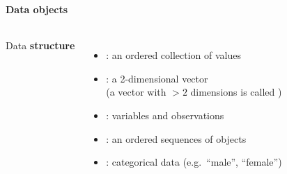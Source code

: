 \documentclass[8pt]{beamer}
\begin{document}
\begin{frame}
\frametitle{\insertsection}
\framesubtitle{Data objects}

\begin{columns}[c]
\begin{minipage}[c][.5\textheight][c]{\linewidth}
	
Data \textbf{structure}
\begin{itemize}[<+(1)->]
\item {\color{blue}{vector}}: an ordered collection of values
\item {\color{blue}{matrix}}: a 2-dimensional vector \\(a vector with $>2$ dimensions is called {\color{blue}{array}})
\item {\color{blue}{data frame}}: variables and observations
\item {\color{blue}{list}}: an ordered sequences of objects
\item {\color{blue}{factor}}: categorical data (e.g.\ ``male'', ``female'')
\end{itemize}

\end{minipage}	   

\begin{minipage}[c][.5\textheight][c]{\linewidth}











\end{minipage}
\end{columns}
\end{frame}
\end{document}
